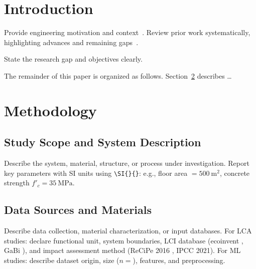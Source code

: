 \documentclass[preprint,12pt,3p]{elsarticle}
\begin{document}
\linenumbers

\section{Introduction}

Provide engineering motivation and context~\cite{Author2023}.
Review prior work systematically, highlighting advances and remaining gaps~\cite{Smith2021,Jones2022}.

State the research gap and objectives clearly.

The remainder of this paper is organized as follows.
Section~\ref{sec:methods} describes \ldots

\section{Methodology}
\label{sec:methods}

\subsection{Study Scope and System Description}
Describe the system, material, structure, or process under investigation.
Report key parameters with SI units using \verb|\SI{}{}|:
e.g., floor area $= \SI{500}{\meter\squared}$,
concrete strength $f'_c = \SI{35}{\mega\pascal}$.

\subsection{Data Sources and Materials}
Describe data collection, material characterization, or input databases.
For LCA studies: declare functional unit, system boundaries,
LCI database (ecoinvent \cite{Wernet2016}, GaBi \cite{Sphera2024}),
and impact assessment method (ReCiPe 2016 \cite{Huijbregts2017}, IPCC 2021).
For ML studies: describe dataset origin, size ($n = $), features, and preprocessing.
\end{document}
